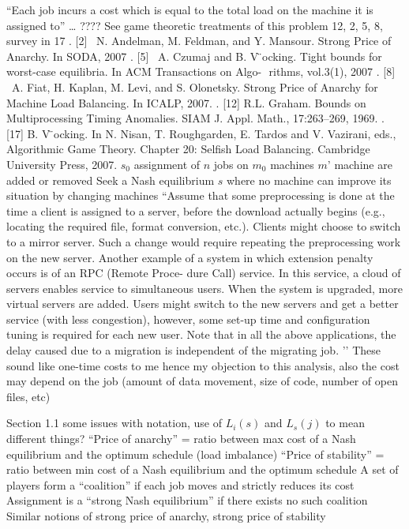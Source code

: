 \documentclass{article}
\begin{document}
“Each job incurs a cost which is equal to the total load on the machine it is assigned to” … ????
See game theoretic treatments of this problem 12, 2, 5, 8, survey in 17
	.	[2]  N. Andelman, M. Feldman, and Y. Mansour. Strong Price of Anarchy. In SODA, 2007 
	.	[5]  A. Czumaj and B. V ̈ocking. Tight bounds for worst-case equilibria. In ACM Transactions on Algo-  rithms, vol.3(1), 2007 
	.	[8]  A. Fiat, H. Kaplan, M. Levi, and S. Olonetsky. Strong Price of Anarchy for Machine Load Balancing. In ICALP, 2007. 
	.	[12] R.L. Graham. Bounds on Multiprocessing Timing Anomalies. SIAM J. Appl. Math., 17:263–269, 1969. 
	.	[17] B. V ̈ocking. In N. Nisan, T. Roughgarden, E. Tardos and V. Vazirani, eds., Algorithmic Game Theory. Chapter 20: Selfish Load Balancing. Cambridge University Press, 2007. 
$s_0$ assignment of $n$ jobs on $m_0$ machines
$m’$ machine are added or removed
Seek a Nash equilibrium $s$ where no machine can improve its situation by changing machines
``Assume that some preprocessing is done at the time a client is assigned to a server, before the download actually begins (e.g., locating the required file, format conversion, etc.). Clients might choose to switch to a mirror server. Such a change would require repeating the preprocessing work on the new server.   Another example of a system in which extension penalty occurs is of an RPC (Remote Proce- dure Call) service. In this service, a cloud of servers enables service to simultaneous users. When the system is upgraded, more virtual servers are added. Users might switch to the new servers and get a better service (with less congestion), however, some set-up time and configuration tuning is required for each new user.  Note that in all the above applications, the delay caused due to a migration is independent of the migrating job. 
’’
These sound like one-time costs to me hence my objection to this analysis, also the cost may depend on the job (amount of data movement, size of code, number of open files, etc)

Section 1.1 some issues with notation, use of $L_i(s)$ and $L_s(j)$ to mean different things?
“Price of anarchy” = ratio between max cost of a Nash equilibrium and the optimum schedule (load imbalance)
“Price of stability” = ratio between min cost of a Nash equilibrium and the optimum schedule
A set of players form a “coalition” if each job moves and strictly reduces its cost
Assignment is a “strong Nash equilibrium” if there exists no such coalition
Similar notions of strong price of anarchy, strong price of stability
\end{document}
